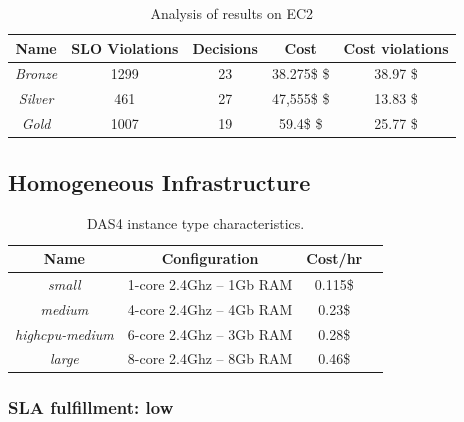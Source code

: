 \begin{table}\label{summaryEC2}
  {\scriptsize 
\begin{center}
    \begin{tabular}{  | c | c | c | c | c |}
    \hline
         \textbf{Name}  & \textbf{SLO Violations} & \textbf{Decisions}  & \textbf{Cost}  & \textbf{Cost violations} \\ \hline
   \textit{Bronze}   &  1299 &  23 &  38.275\$ \$ & 38.97 \$ \\ \hline   
   \textit{Silver}  &  461 &  27 &  47,555\$ \$ &  13.83 \$ \\ \hline   
\textit{Gold} &   1007  &  19 &  59.4\$ \$ & 25.77 \$ \\ \hline   

 \end{tabular}
\end{center}
\vspace{-5mm}
\caption{Analysis of results on EC2}
\label{summaryEC2}
}
\end{table}



\subsection{Homogeneous Infrastructure}

\begin{table}\label{DAS4instances}
  {\scriptsize 
\begin{center}
    \begin{tabular}{  | c | c | c | c | }
    \hline
       \textbf{Name}  & \textbf{Configuration} & \textbf{Cost/hr} \\ \hline
   \textit{small}   & 1-core 2.4Ghz -- 1Gb RAM&  0.115\$ \\ \hline
   \textit{medium}   & 4-core 2.4Ghz  -- 4Gb RAM&  0.23\$ \\ \hline
\textit{highcpu-medium} & 6-core 2.4Ghz -- 3Gb RAM& 0.28\$   \\ \hline
\textit{large} & 8-core 2.4Ghz  -- 8Gb RAM& 0.46\$   \\ \hline

 \end{tabular}
\end{center}
\vspace{-5mm}
\caption{DAS4 instance type characteristics.}
\label{DAS4instances}
}
\end{table}


\subsubsection{SLA fulfillment: low}

